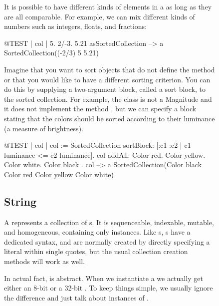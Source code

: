 \documentclass[a4paper,10pt,twoside]{book}
\begin{document}
\begin{figure}
\begin{center}
It is possible to have different kinds of elements in a  as long as they are all comparable.
For example, we can mix different kinds of numbers such as integers, floats, and fractions:
\begin{code}{@TEST | col |}
{ 5. 2/-3. 5.21 } asSortedCollection --> a SortedCollection((-2/3) 5 5.21)
\end{code}

Imagine that you want to sort objects that do not define the method \ct{<=} or that you would like to have a different sorting criterion.
You can do this by supplying a two-argument block, called a sort block, to the sorted collection.
For example, the class  is not a Magnitude and it does not implement the method \ct{<=}, but we can specify a block stating that the colors should be sorted according to their luminance (a measure of brightness).

\begin{code}{@TEST | col |}
col := SortedCollection sortBlock: [:c1 :c2 | c1 luminance <= c2 luminance].
col addAll: { Color red. Color yellow. Color white. Color black }.
col --> a SortedCollection(Color black Color red Color yellow Color white)
\end{code}

\subsection{String}
A \st {} represents a collection of s.
It is sequenceable, indexable, mutable, and homogeneous, containing only  instances.
Like s, s have a dedicated syntax, and are normally created by directly specifying a  literal within single quotes, but the usual collection creation methods will work as well.


In actual fact,  is abstract.
When we instantiate a  we actually get either an 8-bit  or a 32-bit .
To keep things simple, we usually ignore the difference and just talk about instances of .


\end{center}
\end{figure}
\end{document}
